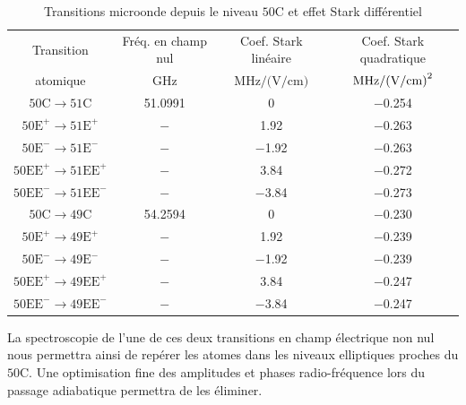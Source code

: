 %
\begin{table}[!h]
	\centering
	\begin{tabular}{cccc}
		\toprule\midrule
		Transition
		& Fréq. en champ nul
		& Coef. Stark linéaire
		& Coef. Stark quadratique
		\\
		atomique
		& $\si{\GHz}$
		& $\si{\MHz \per (\V \per\cm)}$
		& $\si{\MHz \per (\V \per\cm) \squared}$ \\
		\midrule
		$\mathrm{50C \rightarrow 51C}$
		& \SI{51.0991}{}
		& \SI{0}{}
		& \SI{-0.254}{} \\
		$\mathrm{50E^+ \rightarrow 51E^+}$
		& $-$%
		& \SI[retain-explicit-plus]{+1.92}{}
		& \SI{-0.263}{} \\
		$\mathrm{50E^- \rightarrow 51E^-}$
		& $-$%
		& \SI[retain-explicit-plus]{-1.92}{}
		& \SI{-0.263}{} \\
		$\mathrm{50EE^+ \rightarrow 51EE^+}$
		& $-$%
		& \SI[retain-explicit-plus]{+3.84}{}
		& \SI{-0.272}{} \\
		$\mathrm{50EE^- \rightarrow 51EE^-}$
		& $-$%
		& \SI[retain-explicit-plus]{-3.84}{}
		& \SI{-0.273}{} \\
		\midrule
		$\mathrm{50C \rightarrow 49C}$
		& \SI{54.2594}{}
		& \SI{0}{}
		& \SI{-0.230}{} \\
		$\mathrm{50E^+ \rightarrow 49E^+}$
		& $-$%
		& \SI[retain-explicit-plus]{+1.92}{}
		& \SI{-0.239}{} \\
		$\mathrm{50E^- \rightarrow 49E^-}$
		& $-$%
		& \SI[retain-explicit-plus]{-1.92}{}
		& \SI{-0.239}{} \\
		$\mathrm{50EE^+ \rightarrow 49EE^+}$
		& $-$%
		& \SI[retain-explicit-plus]{+3.84}{}
		& \SI{-0.247}{} \\
		$\mathrm{50EE^- \rightarrow 49EE^-}$
		& $-$%
		& \SI[retain-explicit-plus]{-3.84}{}
		& \SI{-0.247}{} \\
		\midrule
		\bottomrule
 	\end{tabular}
 	\caption[Transitions microonde depuis le niveau $\mathrm{50C}$ et effet Stark différentiel]{
	Transitions microonde depuis le niveau $\mathrm{50C}$ et effet Stark différentiel
	}
	\label{tab:Stark_49-50-51C}
\end{table}
%
La spectroscopie de l'une de ces deux transitions en champ électrique non nul nous permettra ainsi de repérer les atomes dans les niveaux elliptiques proches du $\mathrm{50C}$.
Une optimisation fine des amplitudes et phases radio-fréquence lors du passage adiabatique permettra de les éliminer.

